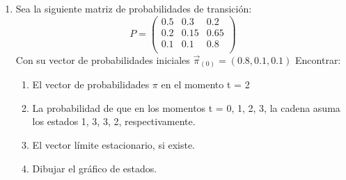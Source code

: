 \documentclass{templateNote}
\begin{document}
\begin{enumerate}[resume, start=9]


    \newpage
    \item Sea la siguiente matriz de probabilidades de transición: 
    \[
    P = \begin{pmatrix}
        0.5 & 0.3   & 0.2 \\
        0.2 & 0.15  & 0.65 \\
        0.1 & 0.1   & 0.8 \\
    \end{pmatrix}
    \]
    Con su vector de probabilidades iniciales $\vec{\pi}_{(0)} = (0.8,0.1,0.1)$
    Encontrar:
    \begin{enumerate}[label=\alph*)]
        \item El vector de probabilidades $\pi$ en el momento t = 2
        \item La probabilidad de que en los momentos t = 0, 1, 2, 3, la cadena asuma los estados 1, 3, 3, 2, respectivamente.
        \item El vector límite estacionario, si existe. 
        \item Dibujar el gráfico de estados.
    \end{enumerate}

\end{enumerate}
\end{document}

